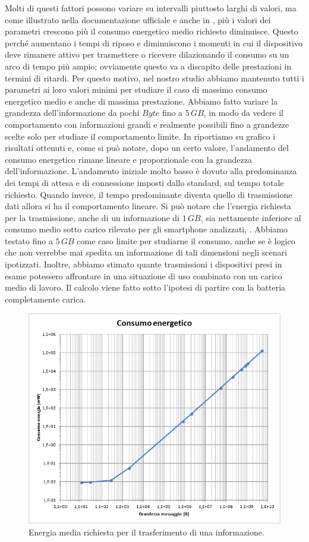 Molti di questi fattori possono variare su intervalli piuttosto larghi di valori, ma come illustrato nella documentazione ufficiale \cite{BT-CoreSpec4.0} e anche in \cite{sensor2012}, più i valori dei parametri crescono più il consumo energetico medio richiesto diminuisce. Questo perché aumentano i tempi di riposo e diminuiscono i momenti in cui il dispositivo deve rimanere attivo per trasmettere o ricevere dilazionando il consumo su un arco di tempo più ampio; ovviamente questo va a discapito delle prestazioni in termini di ritardi. Per questo motivo, nel nostro studio abbiamo mantenuto tutti i parametri ai loro valori minimi per studiare il caso di massimo consumo energetico medio e anche di massima prestazione. Abbiamo fatto variare la grandezza dell'informazione da pochi $Byte$ fino a $5\,GB$, in modo da vedere il comportamento con informazioni grandi e realmente possibili fino a grandezze scelte solo per studiare il comportamento limite. In  riportiamo su grafico i risultati ottenuti e, come si può notare, dopo un certo valore, l'andamento del consumo energetico rimane lineare e proporzionale con la grandezza dell'informazione. L'andamento iniziale molto basso è dovuto alla predominanza dei tempi di attesa e di connessione imposti dallo standard, sul tempo totale richiesto. Quando invece, il tempo predominante diventa quello di trasmissione dati allora si ha il comportamento lineare. Si può notare che l'energia richiesta per la trasmissione, anche di un informazione di $1\,GB$, sia nettamente inferiore al consumo medio sotto carico rilevato per gli smartphone analizzati, . Abbiamo testato fino a $5\,GB$ come caso limite per studiarne il consumo, anche se è logico che non verrebbe mai spedita un informazione di tali dimensioni negli scenari ipotizzati. Inoltre, abbiamo stimato quante trasmissioni i dispositivi presi in esame potessero affrontare in una situazione di uso combinato con un carico medio di lavoro. Il calcolo viene fatto sotto l'ipotesi di partire con la batteria completamente carica.
\begin{figure}[t]
	\centering
	\includegraphics[width=0.8\linewidth]{Images/studio_energetico/cons_en_sing_tx_02}
	\caption[Studio energetico \acs{BLE} singola trasmissione]{Energia media richiesta per il trasferimento di una informazione.}
	\label{fig:cons_en_sing_tx_02}
\end{figure}

